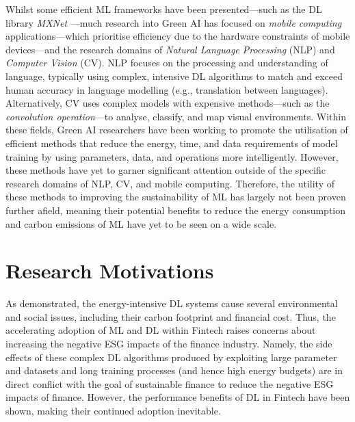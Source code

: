 \documentclass[a4paper, 11pt]{report}
\begin{document}
    Whilst some efficient ML frameworks have been presented---such as the DL library \emph{MXNet} \citep{chen-2015}---much research into Green AI has focused on \emph{mobile computing} applications---which prioritise efficiency due to the hardware constraints of mobile devices---and the research domains of \emph{Natural Language Processing} (NLP) and \emph{Computer Vision} (CV). NLP focuses on the processing and understanding of language, typically using complex, intensive DL algorithms to match and exceed human accuracy in language modelling (e.g., translation between languages). Alternatively, CV uses complex models with expensive methods---such as the \emph{convolution operation}---to analyse, classify, and map visual environments. Within these fields, Green AI researchers have been working to promote the utilisation of efficient methods that reduce the energy, time, and data requirements of model training by using parameters, data, and operations more intelligently. However, these methods have yet to garner significant attention outside of the specific research domains of NLP, CV, and mobile computing. Therefore, the utility of these methods to improving the sustainability of ML has largely not been proven further afield, meaning their potential benefits to reduce the energy consumption and carbon emissions of ML have yet to be seen on a wide scale.


    \section{Research Motivations}
    \label{section: motivations}

    As demonstrated, the energy-intensive DL systems cause several environmental and social issues, including their carbon footprint and financial cost. Thus, the accelerating adoption of ML and DL within Fintech raises concerns about increasing the negative ESG impacts of the finance industry. Namely, the side effects of these complex DL algorithms produced by exploiting large parameter and datasets and long training processes (and hence high energy budgets) are in direct conflict with the goal of sustainable finance to reduce the negative ESG impacts of finance. However, the performance benefits of DL in Fintech have been shown, making their continued adoption inevitable. 
\end{document}
